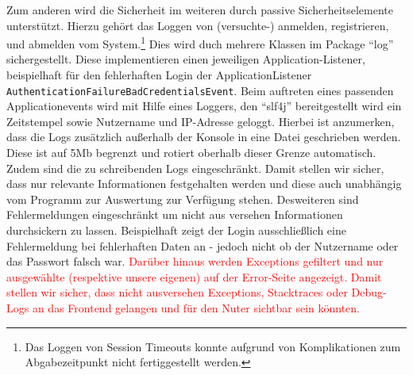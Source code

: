 Zum anderen wird die Sicherheit im weiteren durch passive Sicherheitselemente unterstützt. 
Hierzu gehört das Loggen von (versuchte-) anmelden, registrieren, und abmelden vom System.\footnote{Das Loggen von Session Timeouts konnte aufgrund von Komplikationen zum Abgabezeitpunkt nicht fertiggestellt werden.}
Dies wird duch mehrere Klassen im Package \enquote{log} sichergestellt. Diese implementieren einen jeweiligen Application-Listener, beispielhaft für den fehlerhaften Login der ApplicationListener \texttt{AuthenticationFailureBadCredentialsEvent}. Beim auftreten eines passenden Applicationevents wird mit Hilfe eines Loggers, den \enquote{slf4j} bereitgestellt wird ein Zeitstempel sowie Nutzername und IP-Adresse geloggt.
Hierbei ist anzumerken, dass die Logs zusätzlich außerhalb der Konsole in eine Datei geschrieben werden. Diese ist auf 5Mb begrenzt und rotiert oberhalb dieser Grenze automatisch. 
Zudem sind die zu schreibenden Logs eingeschränkt. 
Damit stellen wir sicher, dass nur relevante Informationen festgehalten werden und diese auch unabhängig vom Programm zur Auswertung zur Verfügung stehen.
Desweiteren sind Fehlermeldungen eingeschränkt um nicht aus versehen Informationen durchsickern zu lassen. Beispielhaft zeigt der Login ausschließlich eine Fehlermeldung bei fehlerhaften Daten an - jedoch nicht ob der Nutzername oder das Passwort falsch war.
\textcolor{red}{Darüber hinaus werden Exceptions gefiltert und nur ausgewählte (respektive unsere eigenen) auf der Error-Seite angezeigt. Damit stellen wir sicher, dass nicht ausversehen Exceptions, Stacktraces oder Debug-Logs an das Frontend gelangen und für den Nuter sichtbar sein könnten.}
